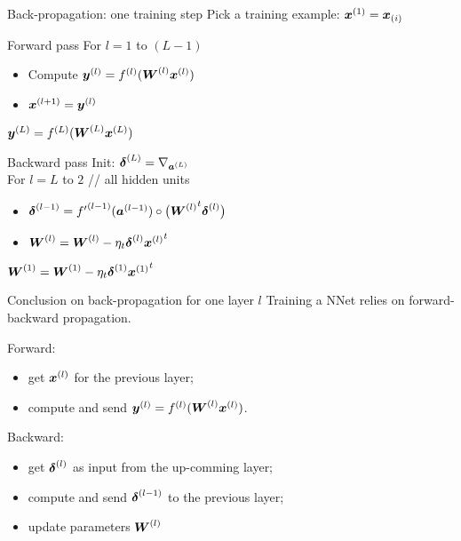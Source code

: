 \begin{frame}{Back-propagation: one training step}
Pick a training example: $\boldsymbol{x}^{(1)} = \boldsymbol{x}_{(i)}$
  \begin{block}{Forward pass}
    For $l=1$ to $(L-1)$
    \begin{itemize}
    \item Compute $\boldsymbol{y}^{(l)}=f^{(l)}(\boldsymbol{W}^{(l)}\boldsymbol{x}^{(l)})$
    \item $\boldsymbol{x}^{(l+1)} = \boldsymbol{y}^{(l)}$
    \end{itemize}
    $\boldsymbol{y}^{(L)}=f^{(L)}(\boldsymbol{W}^{(L)}\boldsymbol{x}^{(L)})$
  \end{block}
  \begin{block}{Backward pass}
    Init: $\boldsymbol{\delta}^{(L)} = \nabla_{\boldsymbol{a}^{(L)}}$\\
    For $l=L$ to $2$ {\color{gray!80}// all hidden units}
    \begin{itemize}
    \item $\boldsymbol{\delta}^{(l-1)} = {f'}^{(l-1)}(\boldsymbol{a}^{(l-1)})\circ \big({\boldsymbol{W}^{(l)}}^t \boldsymbol{\delta}^{(l)}\big)$
    \item $\boldsymbol{W}^{(l)} = \boldsymbol{W}^{(l)}  - \eta_t  \boldsymbol{\delta}^{(l)}{\boldsymbol{x}^{(l)}}^t$
    \end{itemize}
    $\boldsymbol{W}^{(1)} = \boldsymbol{W}^{(1)}  - \eta_t  \boldsymbol{\delta}^{(1)}{\boldsymbol{x}^{(1)}}^t$
  \end{block}
\end{frame}



\begin{frame}{Conclusion on back-propagation for one layer $l$}
  Training a NNet relies on forward-backward propagation. 
  \begin{block}{Forward:}
    \begin{itemize}
    \item get $\boldsymbol{x}^{(l)}$ for the previous layer;
    \item compute and send $\boldsymbol{y}^{(l)}=f^{(l)}(\boldsymbol{W}^{(l)}\boldsymbol{x}^{(l)})$.
    \end{itemize}
  \end{block}
  \begin{block}{Backward:}
    \begin{itemize}
    \item get $\boldsymbol{\delta}^{(l)}$ as input from the up-comming
      layer;
    \item compute and send $\boldsymbol{\delta}^{(l-1)}$ to the previous layer;
    \item update parameters $\boldsymbol{W}^{(l)}$
    \end{itemize}
  \end{block}
\end{frame}



